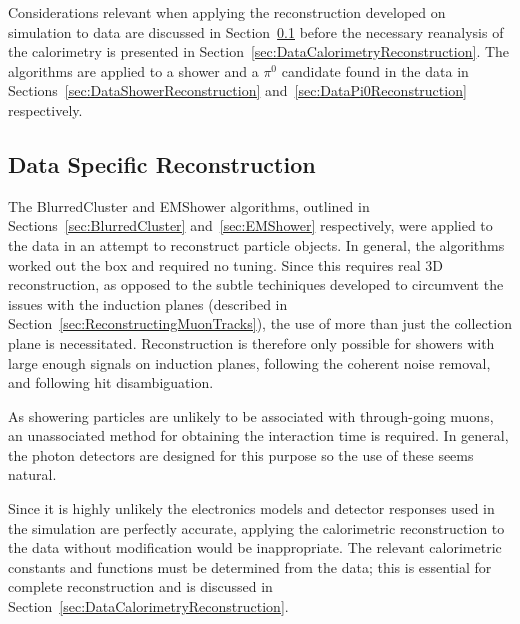 Considerations relevant when applying the reconstruction developed on simulation to data are discussed in Section~\ref{sec:DataSpecificReconstruction} before the necessary reanalysis of the calorimetry is presented in Section~\ref{sec:DataCalorimetryReconstruction}.  The algorithms are applied to a shower and a $\pi^0$ candidate found in the data in Sections~\ref{sec:DataShowerReconstruction} and~\ref{sec:DataPi0Reconstruction} respectively.

\subsection{Data Specific Reconstruction}\label{sec:DataSpecificReconstruction}

The BlurredCluster and EMShower algorithms, outlined in Sections~\ref{sec:BlurredCluster} and~\ref{sec:EMShower} respectively, were applied to the data in an attempt to reconstruct particle objects.  In general, the algorithms worked out the box and required no tuning.  Since this requires real 3D reconstruction, as opposed to the subtle techiniques developed to circumvent the issues with the induction planes (described in Section~\ref{sec:ReconstructingMuonTracks}), the use of more than just the collection plane is necessitated.  Reconstruction is therefore only possible for showers with large enough signals on induction planes, following the coherent noise removal, and following hit disambiguation.

As showering particles are unlikely to be associated with through-going muons, an unassociated method for obtaining the interaction time is required.  In general, the photon detectors are designed for this purpose so the use of these seems natural.

Since it is highly unlikely the electronics models and detector responses used in the simulation are perfectly accurate, applying the calorimetric reconstruction to the data without modification would be inappropriate.  The relevant calorimetric constants and functions must be determined from the data; this is essential for complete reconstruction and is discussed in Section~\ref{sec:DataCalorimetryReconstruction}.

